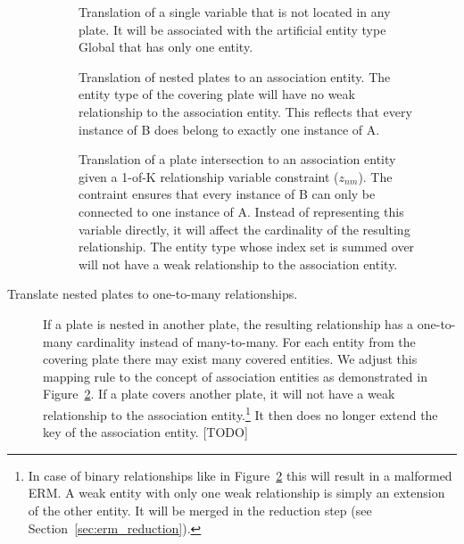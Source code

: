 \begin{description}
\begin{figure}[p]
\centering
\scalebox{\tikzScale}{\adjustTikzSize }
\caption[Translation of a variable associated with no plate to an ERM]{Translation of a single variable that is not located in any plate. It will be associated with the artificial entity type Global that has only one entity.}\label{fig:pm2erm_uno_global}
\end{figure}

\begin{figure}[p]
\centering
\scalebox{\tikzScale}{\adjustTikzSize }
\caption[Translation of nested plates to an ERM]{Translation of nested plates to an association entity. The entity type of the covering plate will have no weak relationship to the association entity. This reflects that every instance of B does belong to exactly one instance of A.}\label{fig:pm2erm_covered_1}
\end{figure}

\begin{figure}[p]
\centering
\scalebox{\tikzScale}{\adjustTikzSize }
\caption[Translation of plate intersections with 1-of-K variables to an ERM]{Translation of a plate intersection to an association entity given a 1-of-K relationship variable constraint ($z_{nm}$). The contraint ensures that every instance of B can only be connected to one instance of A. Instead of representing this variable directly, it will affect the cardinality of the resulting relationship. The entity type whose index set is summed over will not have a weak relationship to the association entity.}\label{fig:pm2erm_bi_constraints}
\end{figure}

\item[Translate nested plates to one-to-many relationships.] If a plate is nested in another plate, the resulting relationship has a one-to-many cardinality instead of many-to-many. For each entity from the covering plate there may exist many covered entities. We adjust this mapping rule to the concept of association entities as demonstrated in Figure~\ref{fig:pm2erm_covered_1}. If a plate covers another plate, it will not have a weak relationship to the association entity.\footnote{In case of binary relationships like in Figure~\ref{fig:pm2erm_covered_1} this will result in a malformed ERM. A weak entity with only one weak relationship is simply an extension of the other entity. It will be merged in the reduction step (see Section~\ref{sec:erm_reduction}).} It then does no longer extend the key of the association entity. [TODO]
\end{description}

